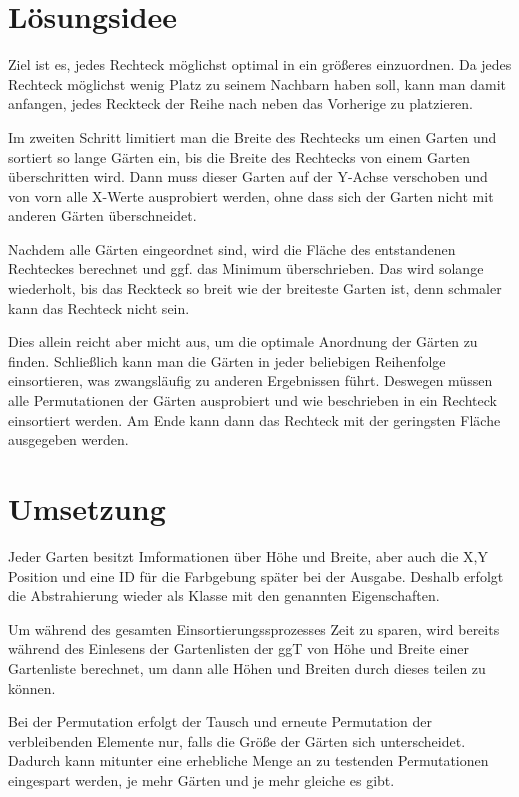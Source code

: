 \documentclass[a4paper,10pt,ngerman]{scrartcl}
\title{\Aufgabe}
\author{\Name\\Team-ID: \TeamId}
\date{\today}
\begin{document}
\maketitle
\tableofcontents

\section{Lösungsidee}
Ziel ist es, jedes Rechteck möglichst optimal in ein größeres einzuordnen. Da jedes Rechteck möglichst wenig Platz zu seinem Nachbarn haben soll, kann man damit anfangen, jedes Reckteck der Reihe nach neben das Vorherige zu platzieren.

Im zweiten Schritt limitiert man die Breite des Rechtecks um einen Garten und sortiert so lange Gärten ein, bis die Breite des Rechtecks von einem Garten überschritten wird. Dann muss dieser Garten auf der Y-Achse verschoben und von vorn alle X-Werte ausprobiert werden, ohne dass sich der Garten nicht mit anderen Gärten überschneidet.

Nachdem alle Gärten eingeordnet sind, wird die Fläche des entstandenen Rechteckes berechnet und ggf. das Minimum überschrieben. Das wird solange wiederholt, bis das Reckteck so breit wie der breiteste Garten ist, denn schmaler kann das Rechteck nicht sein.

Dies allein reicht aber micht aus, um die optimale Anordnung der Gärten zu finden. Schließlich kann man die Gärten in jeder beliebigen Reihenfolge einsortieren, was zwangsläufig zu anderen Ergebnissen führt. Deswegen müssen alle Permutationen der Gärten ausprobiert und wie beschrieben in ein Rechteck einsortiert werden. Am Ende kann dann das Rechteck mit der geringsten Fläche ausgegeben werden.

\section{Umsetzung}
Jeder Garten besitzt Imformationen über Höhe und Breite, aber auch die X,Y Position und eine ID für die Farbgebung später bei der Ausgabe. Deshalb erfolgt die Abstrahierung wieder als Klasse mit den genannten Eigenschaften.

Um während des gesamten Einsortierungssprozesses Zeit zu sparen, wird bereits während des Einlesens der Gartenlisten der ggT von Höhe und Breite einer Gartenliste berechnet, um dann alle Höhen und Breiten durch dieses teilen zu können.

Bei der Permutation erfolgt der Tausch und erneute Permutation der verbleibenden Elemente nur, falls die Größe der Gärten sich unterscheidet. Dadurch kann mitunter eine erhebliche Menge an zu testenden Permutationen eingespart werden, je mehr Gärten und je mehr gleiche es gibt.
\end{document}
